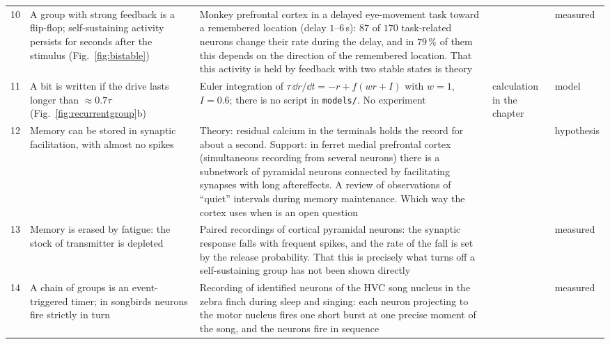 {\begin{longtable}{>{\raggedright}p{0.5cm}>{\raggedright}p{4.0cm}>{\raggedright}p{5.6cm}>{\raggedright}p{2.3cm}>{\raggedright\arraybackslash}p{1.7cm}}
10 & A group with strong feedback is a flip-flop; self-sustaining activity persists for seconds after the stimulus (Fig.~\ref{fig:bistable}) & Monkey prefrontal cortex in a delayed eye-movement task toward a remembered location (delay $1$--$6$\,s): $87$ of $170$ task-related neurons change their rate during the delay, and in $79\,\%$ of them this depends on the direction of the remembered location. That this activity is held by feedback with two stable states is theory & \cite{Funahashi1989,Wang2001} & measured \\
11 & A bit is written if the drive lasts longer than $\approx0.7\tau$ (Fig.~\ref{fig:recurrentgroup}b) & Euler integration of $\tau\,\dd r/\dd t=-r+f(wr+I)$ with $w=1$, $I=0.6$; there is no script in \texttt{models/}. No experiment & calculation in the chapter & model \\
12 & Memory can be stored in synaptic facilitation, with almost no spikes & Theory: residual calcium in the terminals holds the record for about a second. Support: in ferret medial prefrontal cortex (simultaneous recording from several neurons) there is a subnetwork of pyramidal neurons connected by facilitating synapses with long aftereffects. A review of observations of ``quiet'' intervals during memory maintenance. Which way the cortex uses when is an open question & \cite{Mongillo2008,WangMarkram2006,Stokes2015} & hypothesis \\
13 & Memory is erased by fatigue: the stock of transmitter is depleted & Paired recordings of cortical pyramidal neurons: the synaptic response falls with frequent spikes, and the rate of the fall is set by the release probability. That this is precisely what turns off a self-sustaining group has not been shown directly & \cite{Tsodyks1997} & measured \\
14 & A chain of groups is an event-triggered timer; in songbirds neurons fire strictly in turn & Recording of identified neurons of the HVC song nucleus in the zebra finch during sleep and singing: each neuron projecting to the motor nucleus fires one short burst at one precise moment of the song, and the neurons fire in sequence & \cite{Hahnloser2002} & measured \\
\bottomrule
\end{longtable}}
